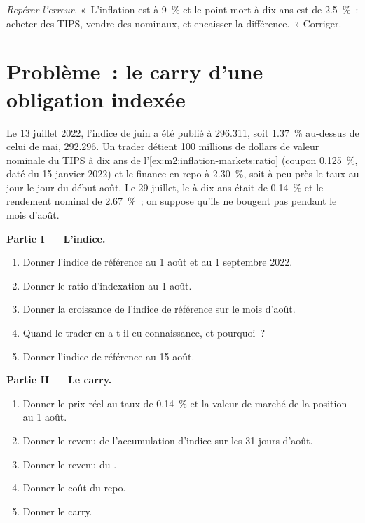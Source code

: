 \begin{exercise}[$\star\star\star$]\label{exo:m2:inflation-markets:8}
\emph{Repérer l'erreur.} «~L'inflation est à 9~\% et le point mort à dix ans
est de 2.5~\%~: acheter des TIPS, vendre des  nominaux, et encaisser la différence.~»
Corriger.
\end{exercise}

\section{Problème~: le carry d'une obligation indexée}

\begin{problem}\label{pb:m2:inflation-markets:1}
Le 13 juillet 2022, l'indice de juin a été publié à 296.311, soit 1.37~\% au-dessus de celui de mai,
292.296. Un trader détient 100 millions de dollars de valeur nominale du TIPS à dix ans de
l'\cref{ex:m2:inflation-markets:ratio} (coupon 0.125~\%, daté du 15 janvier 2022)
et le finance en repo à 2.30~\%, soit à peu près le taux au jour le jour du début août. Le
29 juillet, le  à dix ans était de 0.14~\% et le rendement nominal de 2.67~\%~;
on suppose qu'ils ne bougent pas pendant le mois d'août.

\medskip\noindent\textbf{Partie I --- L'indice.}
\begin{enumerate}
\item Donner l'indice de référence au 1 août et au 1 septembre 2022.
\item Donner le ratio d'indexation au 1 août.
\item Donner la croissance de l'indice de référence sur le mois d'août.
\item Quand le trader en a-t-il eu connaissance, et pourquoi~?
\item Donner l'indice de référence au 15 août.
\end{enumerate}

\medskip\noindent\textbf{Partie II --- Le carry.}
\begin{enumerate}[resume]
\item Donner le prix réel au taux de 0.14~\% et la valeur de marché de la position au 1 août.
\item Donner le revenu de l'accumulation d'indice sur les 31 jours d'août.
\item Donner le revenu du .
\item Donner le coût du repo.
\item Donner le carry.
\end{enumerate}


\end{problem}
